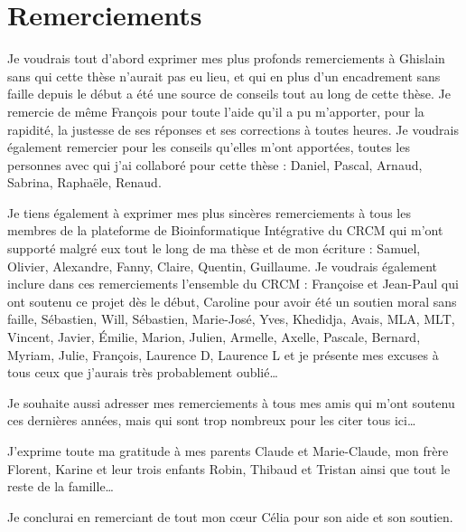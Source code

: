 \chapter*{Remerciements}

\noindent{}Je voudrais tout d'abord exprimer mes plus profonds remerciements à Ghislain sans qui cette thèse n'aurait pas eu lieu, et qui en plus d'un encadrement sans faille depuis le début a été une source de conseils tout au long de cette thèse. Je remercie de même François pour toute l'aide qu'il a pu m'apporter, pour la rapidité, la justesse de ses réponses et ses corrections à toutes heures. Je voudrais également remercier pour les conseils qu'elles m'ont apportées, toutes les personnes avec qui j'ai collaboré pour cette thèse : Daniel, Pascal, Arnaud, Sabrina, Raphaële, Renaud.
\vspace{.5cm}

\noindent{}Je tiens également à exprimer mes plus sincères remerciements à tous les membres de la plateforme de Bioinformatique Intégrative du \acs{CRCM} qui m'ont supporté malgré eux tout le long de ma thèse et de mon écriture : Samuel, Olivier, Alexandre, Fanny, Claire, Quentin, Guillaume. Je voudrais également inclure dans ces remerciements l'ensemble du CRCM : Françoise et Jean-Paul qui ont soutenu ce projet dès le début, Caroline pour avoir été un soutien moral sans faille, Sébastien, Will, Sébastien, Marie-José, Yves, Khedidja, Avais, MLA, MLT, Vincent, Javier, Émilie, Marion, Julien, Armelle, Axelle, Pascale, Bernard, Myriam, Julie, François, Laurence D, Laurence L et je présente mes excuses à tous ceux que j'aurais très probablement oublié\dots
\vspace{.5cm}

\noindent{}Je souhaite aussi adresser mes remerciements à tous mes amis qui m'ont soutenu ces dernières années, mais qui sont trop nombreux pour les citer tous ici\dots
\vspace{.5cm}

\noindent{}J'exprime toute ma gratitude à mes parents Claude et Marie-Claude, mon frère Florent, Karine et leur trois enfants Robin, Thibaud et Tristan ainsi que tout le reste de la famille\dots
\vspace{.5cm}

\noindent{}Je conclurai en remerciant de tout mon c{\oe}ur Célia pour son aide et son soutien.